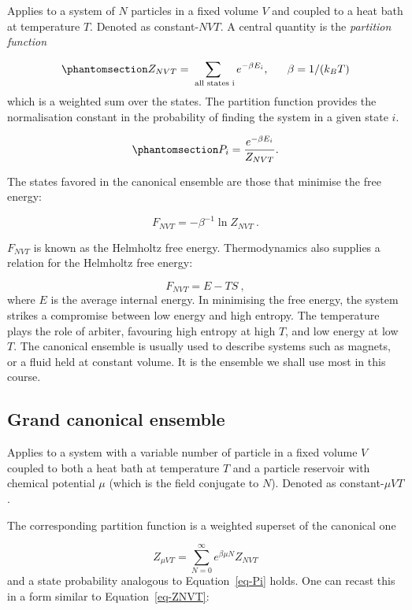 \documentclass[
  letterpaper,
  DIV=11,
  numbers=noendperiod]{scrreprt}
\begin{document}
Applies to a system of \(N\) particles in a fixed volume \(V\) and
coupled to a heat bath at temperature \(T\). Denoted as
constant-\(NVT\). A central quantity is the \emph{partition function}

\begin{equation}\phantomsection\label{eq-ZNVT}{
Z_{NVT}=\sum_\textrm{ all states i}e^{-\beta E_i},~~~~~\beta=1/(k_BT)
}\end{equation} which is a weighted sum over the states. The partition
function provides the normalisation constant in the probability of
finding the system in a given state \(i\).

\begin{equation}\phantomsection\label{eq-Pi}{
P_i=\frac{e^{-\beta E_i}}{Z_{NVT}}.
}\end{equation}

The states favored in the canonical ensemble are those that minimise the
free energy:

\[
F_{NVT}=-\beta^{-1}\ln Z_{NVT}\:.
\]

\(F_{NVT}\) is known as the Helmholtz free energy. Thermodynamics also
supplies a relation for the Helmholtz free energy:

\[
F_{NVT}=E-TS\:,
\] where \(E\) is the average internal energy. In minimising the free
energy, the system strikes a compromise between low energy and high
entropy. The temperature plays the role of arbiter, favouring high
entropy at high \(T\), and low energy at low \(T\). The canonical
ensemble is usually used to describe systems such as magnets, or a fluid
held at constant volume. It is the ensemble we shall use most in this
course.

\subsection*{Grand canonical ensemble}\label{sec-grandcanonical}

Applies to a system with a variable number of particle in a fixed volume
\(V\) coupled to both a heat bath at temperature \(T\) and a particle
reservoir with chemical potential \(\mu\) (which is the field conjugate
to \(N\)). Denoted as constant-\(\mu VT\).

The corresponding partition function is a weighted superset of the
canonical one

\[
Z_{\mu VT}=\sum_{N=0}^\infty e^{\beta\mu N}Z_{NVT}
\] and a state probability analogous to Equation~\ref{eq-Pi} holds. One
can recast this in a form similar to Equation~\ref{eq-ZNVT}:
\end{document}

